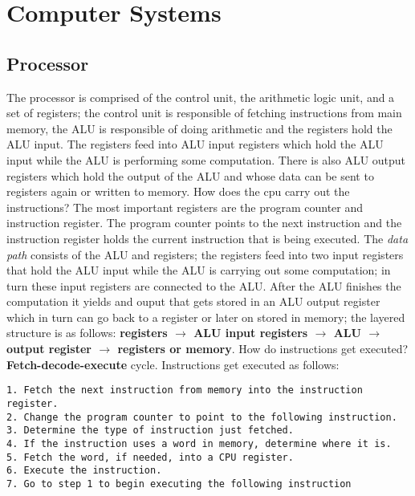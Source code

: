 \documentclass{amsbook}
\begin{document}
\section{Computer Systems}
\subsection{Processor}
The processor is comprised of the control unit, the arithmetic logic unit, and a set of registers; the control unit is responsible of fetching instructions from main memory, the ALU is responsible of doing arithmetic and the registers hold the ALU input. The registers feed into ALU input registers which hold the ALU input while the ALU is performing some computation. There is also ALU output registers which hold the output of the ALU and whose data can be sent to registers again or written to memory. How does the cpu carry out the instructions? The most important registers are the program counter and instruction register. The program counter points to the next instruction and the instruction register holds the current instruction that is being executed. The \textit{data path} consists of the ALU and registers; the registers feed into two input registers that hold the ALU input while the ALU is carrying out some computation; in turn these input registers are connected to the ALU. After the ALU finishes the computation it yields and ouput that gets stored in an ALU output register which in turn can go back to a register or later on stored in memory; the layered structure is as follows: \textbf{registers $\rightarrow$ ALU input registers $\rightarrow$ ALU $\rightarrow$ output register $\rightarrow$ registers or memory}. How do instructions get executed? \textbf{Fetch-decode-execute} cycle. Instructions get executed as follows:
\begin{lstlisting}
1. Fetch the next instruction from memory into the instruction register.
2. Change the program counter to point to the following instruction.
3. Determine the type of instruction just fetched.
4. If the instruction uses a word in memory, determine where it is.
5. Fetch the word, if needed, into a CPU register.
6. Execute the instruction.
7. Go to step 1 to begin executing the following instruction
\end{lstlisting}
\end{document}
